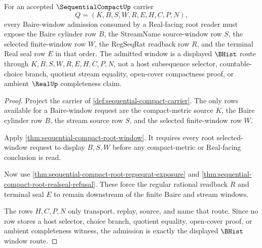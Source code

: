 \begin{theorem}
\label{thm:sequentialcompact-baire-real-window-admission}
For an accepted $\SequentialCompactUp$ carrier
$$
Q=(K,B,S,W,R,E,H,C,P,N),
$$
every Baire-window admission consumed by a Real-facing root reader must expose the Baire cylinder row $B$, the StreamName source-window row $S$, the selected finite-window row $W$, the RegSeqRat readback row $R$, and the terminal Real seal row $E$ in that order. The admitted window is a displayed $\BHist$ route through $K,B,S,W,R,E,H,C,P,N$, not a host subsequence selector, countable-choice branch, quotient stream equality, open-cover compactness proof, or ambient $\RealUp$ completeness claim.
\end{theorem}
\begin{proof}
Project the carrier of \autoref{def:sequential-compact-carrier}. The only rows available for a Baire-window request are the compact-metric source $K$, the Baire cylinder row $B$, the stream source row $S$, and the selected finite-window row $W$.

Apply \autoref{thm:sequential-compact-root-window}. It requires every root selected-window request to display $B,S,W$ before any compact-metric or Real-facing conclusion is read.

Now use \autoref{thm:sequential-compact-root-regseqrat-exposure} and \autoref{thm:sequential-compact-root-realseal-refusal}. These force the regular rational readback $R$ and terminal seal $E$ to remain downstream of the finite Baire and stream windows.

The rows $H,C,P,N$ only transport, replay, source, and name that route. Since no row stores a host selector, choice branch, quotient equality, open-cover proof, or ambient completeness witness, the admission is exactly the displayed $\BHist$ window route.
\end{proof}

